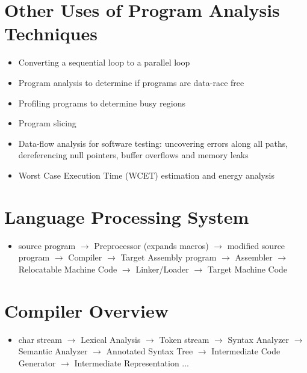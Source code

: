 \documentclass[a4paper,12pt]{article}
\begin{document}
\section{Other Uses of Program Analysis Techniques}
\begin{itemize}[leftmargin=1.5em]
    \item Converting a sequential loop to a parallel loop
    \item Program analysis to determine if programs are data-race free
    \item Profiling programs to determine busy regions
    \item Program slicing
    \item Data-flow analysis for software testing: uncovering errors along all paths, dereferencing null pointers, buffer overflows and memory leaks
    \item Worst Case Execution Time (WCET) estimation and energy analysis
\end{itemize}

\section{Language Processing System}
\begin{itemize}[leftmargin=1.5em]
    \item source program $\rightarrow$ Preprocessor (expands macros) $\rightarrow$ modified source program $\rightarrow$ Compiler $\rightarrow$ Target Assembly program $\rightarrow$ Assembler $\rightarrow$ Relocatable Machine Code $\rightarrow$ Linker/Loader $\rightarrow$ Target Machine Code
\end{itemize}

\section{Compiler Overview}
\begin{itemize}[leftmargin=1.5em]
    \item char stream $\rightarrow$ Lexical Analysis $\rightarrow$ Token stream $\rightarrow$ Syntax Analyzer $\rightarrow$ Semantic Analyzer $\rightarrow$ Annotated Syntax Tree $\rightarrow$ Intermediate Code Generator $\rightarrow$ Intermediate Representation ...
\end{itemize}
\end{document}
